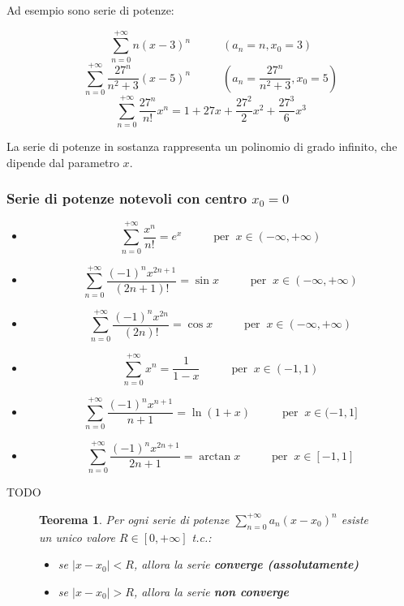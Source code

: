 \documentclass[a4paper]{article}
\newtheorem{theorem}{Teorema}
\theoremstyle{break}
\theoremstyle{break}
\theoremstyle{break}
\theoremstyle{break}
\begin{document}
Ad esempio sono serie di potenze:
\begin{figure}[H]
  \begin{example}
    \[
      \sum_{n=0}^{+\infty} n(x-3)^n \;\;\;\;\;\;\;\;\;\; (a_n=n, x_0=3)
    \] 
    \[
      \sum_{n=0}^{+\infty} \frac{27^n}{n^2+3}(x-5)^n \;\;\;\;\;\;\;\;\;\; (a_n = \frac{27^n}{n^2+3}, x_0=5)
    \] 
    \[
      \sum_{n=0}^{+\infty} \frac{27^n}{n!}x^n = 1+27x+\frac{27^2}{2}x^2+\frac{27^3}{6}x^3
    \] 
  \end{example}
\end{figure}
La serie di potenze in sostanza rappresenta un polinomio di grado infinito, che dipende dal parametro \( x \).
\subsubsection{Serie di potenze notevoli con centro \texorpdfstring{\( x_0 = 0 \)}{x\_0 = 0}}
\begin{itemize}
  \item \[
      \sum_{n=0}^{+\infty} \frac{x^n}{n!} = e^x \;\;\;\;\;\;\;\;\;\; \text{per}\;\; x \in (-\infty, +\infty)
    \] 
  \item \[
      \sum_{n=0}^{+\infty} \frac{(-1)^nx^{2n+1}}{(2n+1)!} = \sin x \;\;\;\;\;\;\;\;\;\; \text{per}\;\; x \in (-\infty, +\infty)
    \] 
  \item \[
      \sum_{n=0}^{+\infty} \frac{(-1)^nx^{2n}}{(2n)!} = \cos x \;\;\;\;\;\;\;\;\;\; \text{per}\;\; x \in (-\infty, +\infty)
    \] 
  \item \[
      \sum_{n=0}^{+\infty} x^n = \frac{1}{1-x} \;\;\;\;\;\;\;\;\;\; \text{per}\;\; x \in (-1, 1)
    \] 
  \item \[
      \sum_{n=0}^{+\infty} \frac{(-1)^nx^{n+1}}{n+1} = \ln(1+x) \;\;\;\;\;\;\;\;\;\; \text{per}\;\; x \in (-1, 1]
    \] 
  \item \[
      \sum_{n=0}^{+\infty} \frac{(-1)^n x^{2n+1}}{2n+1} = \arctan x \;\;\;\;\;\;\;\;\;\; \text{per}\;\; x \in [-1, 1]
    \] 
\end{itemize}
TODO
\begin{figure}[H]
  \begin{theorem}
    Per ogni serie di potenze \( \sum_{n=0}^{+\infty} a_n(x-x_0)^n \) esiste un unico valore \( R \in [0, +\infty] \) t.c.:
    \begin{itemize}
      \item se \( |x-x_0| < R \), allora la serie \textbf{converge (assolutamente)}
      \item se \( |x-x_0| > R \), allora la serie \textbf{non converge}
    \end{itemize}
    \label{D2}
    \label{Teorema del raggio di convergenza}
  \end{theorem}
\end{figure}
\end{document}
